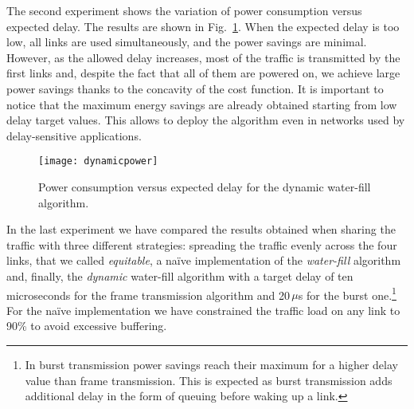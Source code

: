 \documentclass[journal,english,twocolumn,10pt,letterpaper]{IEEEtran}
\newcommand{\added}[1]{{#1}}
\begin{document}
The second experiment shows the variation of power consumption versus expected
delay. The results are shown in \added{Fig.}~\ref{fig:powervsdelay}. When the
expected delay is too low, all links are used simultaneously, and the power
savings are minimal. However, as the allowed delay increases, most of the
traffic is transmitted by the first links and, despite the fact that all of
them are powered on, we achieve large power savings thanks to the concavity of
the cost function. It is important to notice that the maximum energy savings
are already obtained starting from low delay target values. This allows to
deploy the algorithm even in networks used by delay-sensitive applications.
\begin{figure}
  \centering
  \texttt{[image: dynamicpower]}
  \caption{Power consumption versus expected delay for the dynamic water-fill algorithm.}
  \label{fig:powervsdelay}
\end{figure}

In the last experiment we have compared the results obtained when sharing the
traffic with three different strategies: spreading the traffic evenly across
the four links, that we called \emph{equitable}, a naïve implementation of the
\emph{water-fill} algorithm and, finally, the \emph{dynamic} water-fill
algorithm with a target delay of ten microseconds for the frame transmission
algorithm and 20$\,\mu$s for the burst one.\footnote{In burst transmission
  power savings reach their maximum for a higher delay value than frame
  transmission. This is expected as burst transmission adds additional delay
  in the form of queuing before waking up a link.} For the naïve
implementation we have constrained the traffic load on any link to 90\% to
avoid excessive buffering.
\end{document}
